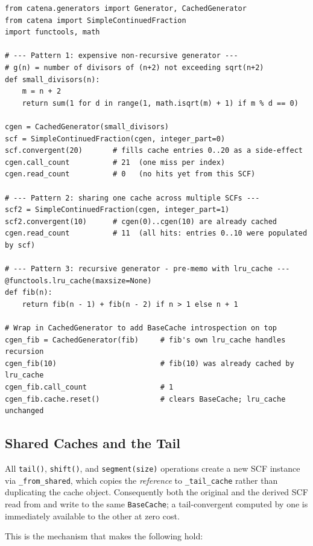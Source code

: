\begin{catenadef}
\begin{lstlisting}[style=python]
from catena.generators import Generator, CachedGenerator
from catena import SimpleContinuedFraction
import functools, math

# --- Pattern 1: expensive non-recursive generator ---
# g(n) = number of divisors of (n+2) not exceeding sqrt(n+2)
def small_divisors(n):
    m = n + 2
    return sum(1 for d in range(1, math.isqrt(m) + 1) if m % d == 0)

cgen = CachedGenerator(small_divisors)
scf = SimpleContinuedFraction(cgen, integer_part=0)
scf.convergent(20)       # fills cache entries 0..20 as a side-effect
cgen.call_count          # 21  (one miss per index)
cgen.read_count          # 0   (no hits yet from this SCF)

# --- Pattern 2: sharing one cache across multiple SCFs ---
scf2 = SimpleContinuedFraction(cgen, integer_part=1)
scf2.convergent(10)      # cgen(0)..cgen(10) are already cached
cgen.read_count          # 11  (all hits: entries 0..10 were populated by scf)

# --- Pattern 3: recursive generator - pre-memo with lru_cache ---
@functools.lru_cache(maxsize=None)
def fib(n):
    return fib(n - 1) + fib(n - 2) if n > 1 else n + 1

# Wrap in CachedGenerator to add BaseCache introspection on top
cgen_fib = CachedGenerator(fib)     # fib's own lru_cache handles recursion
cgen_fib(10)                        # fib(10) was already cached by lru_cache
cgen_fib.call_count                 # 1
cgen_fib.cache.reset()              # clears BaseCache; lru_cache unchanged
\end{lstlisting}
\end{catenadef}

\subsection{Shared Caches and the Tail}

All \texttt{tail()}, \texttt{shift()}, and \texttt{segment(size)} operations
create a new SCF instance via \texttt{\_from\_shared}, which copies the
\emph{reference} to \texttt{\_tail\_cache} rather than duplicating the cache
object.  Consequently both the original and the derived SCF read from and write
to the same \texttt{BaseCache}; a tail-convergent computed by one is
immediately available to the other at zero cost.

This is the mechanism that makes the following hold:

